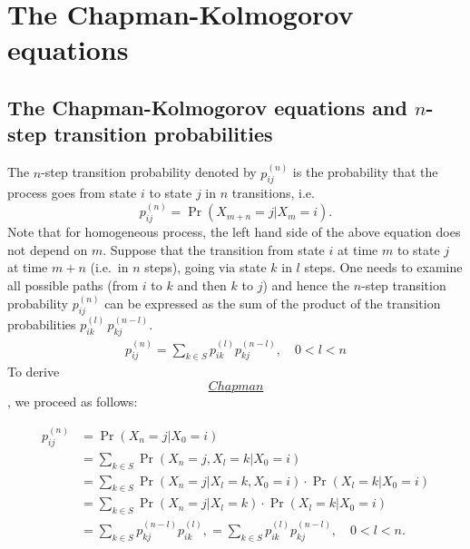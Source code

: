 \documentclass[
]{book}
\theoremstyle{definition}
\theoremstyle{definition}
\theoremstyle{definition}
\theoremstyle{definition}
\theoremstyle{remark}
\begin{document}
\hypertarget{the-chapman-kolmogorov-equations}{%
\chapter{The Chapman-Kolmogorov equations}\label{the-chapman-kolmogorov-equations}}

\hypertarget{the-chapman-kolmogorov-equations-and-n-step-transition-probabilities}{%
\section{\texorpdfstring{The Chapman-Kolmogorov equations and \(n\)-step transition probabilities}{The Chapman-Kolmogorov equations and n-step transition probabilities}}\label{the-chapman-kolmogorov-equations-and-n-step-transition-probabilities}}

The \(n\)-step transition probability denoted by \(p^{(n)}_{ij}\) is the
probability that the process goes from state \(i\) to state \(j\) in \(n\)
transitions, i.e.~\[p^{(n)}_{ij} = \Pr(X_{m+n} = j | X_m = i ).\] Note
that for homogeneous process, the left hand side of the above equation
does not depend on \(m\). Suppose that the transition from state \(i\) at
time \(m\) to state \(j\) at time \(m+n\) (i.e.~in \(n\) steps), going via state
\(k\) in \(l\) steps. One needs to examine all possible paths (from \(i\) to
\(k\) and then \(k\) to \(j\)) and hence the \(n\)-step transition probability
\(p^{(n)}_{ij}\) can be expressed as the sum of the product of the
transition probabilities \(p^{(l)}_{ik} \, p^{(n-l)}_{kj}\).
\[\begin{aligned}
 \label{Chapman}
    p^{(n)}_{ij} = \sum_{k \in S}p^{(l)}_{ik} p^{(n-l)}_{kj}, \quad 0 < l < n  \end{aligned}\]
To derive \protect\hyperlink{Chapman}{\[Chapman\]}, we proceed as follows:

\[\begin{aligned}
    p^{(n)}_{ij} &= \Pr(X_n = j | X_0 = i) \\
    &= \sum_{k \in S} \Pr(X_n = j , X_l = k | X_0 = i)    \\
    &= \sum_{k \in S} \Pr(X_n = j | X_l = k , X_0 = i)  \cdot   \Pr(X_l = k |  X_0 = i) \\
    &= \sum_{k \in S} \Pr(X_n = j | X_l = k )  \cdot   \Pr(X_l = k |  X_0 = i) \\
    &= \sum_{k \in S}p^{(n-l)}_{kj} p^{(l)}_{ik} , = \sum_{k \in S}p^{(l)}_{ik} p^{(n-l)}_{kj}, \quad 0 < l < n . \end{aligned}\]
\end{document}
